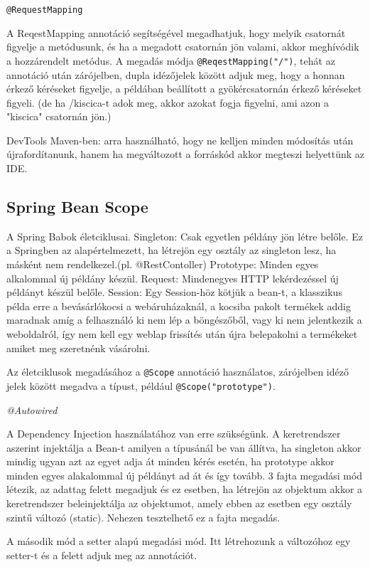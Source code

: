 \documentclass[11pt]{article}
\begin{document}
\texttt{@RequestMapping}

A ReqestMapping annotáció segítségével megadhatjuk, hogy melyik csatornát figyelje a metódusunk, és ha a megadott csatornán jön valami, akkor meghívódik a hozzárendelt metódus.  A megadás módja \texttt{@ReqestMapping("/")}, tehát az annotáció után zárójelben, dupla idézőjelek között adjuk meg, hogy a honnan érkező kéréseket figyelje, a példában beállított a gyökércsatornán érkező kéréseket figyeli. (de ha /kiscica-t adok meg, akkor azokat fogja figyelni, ami azon a "kiscica" csatornán jön.)

DevTools Maven-ben: arra használható, hogy ne kelljen minden módosítás után újrafordítanunk, hanem ha megváltozott a forráskód akkor megteszi helyettünk az IDE.

\subsection{Spring Bean Scope}

A Spring Babok életciklusai.
Singleton: Csak egyetlen példány jön létre belőle. Ez a Springben az alapértelmezett, ha létrejön egy osztály az singleton lesz, ha másként nem rendelkezel.(pl. @RestContoller)
Prototype: Minden egyes alkalommal új példány készül.
Request: Mindenegyes HTTP lekérdezéssel új példányt készül belőle.
Session: Egy Session-höz kötjük a bean-t, a klasszikus példa erre a bevásárlókocsi a webáruházaknál, a kocsiba pakolt termékek addig maradnak amíg a felhasználó ki nem lép a böngészőből, vagy ki nem jelentkezik a weboldalról, így nem kell egy weblap frissítés után újra belepakolni a termékeket amiket meg szeretnénk vásárolni.

Az életciklusok megadásához a \texttt{@Scope} annotáció használatos, zárójelben idéző jelek között megadva a típust, például \texttt{@Scope("prototype")}.

\textit{@Autowired}

A Dependency Injection használatához van erre szükségünk. A keretrendszer aszerint injektálja a Bean-t amilyen a típusánál be van állítva, ha singleton akkor mindig ugyan azt az egyet adja át minden kérés esetén, ha prototype akkor minden egyes alakalommal új példányt ad át és így tovább.
3 fajta megadási mód létezik, az adattag felett megadjuk és ez esetben, ha létrejön az objektum akkor a keretrendszer beleinjektálja az objektumot, amely ebben az esetben egy osztály szintű változó (static). Nehezen tesztelhető ez a fajta megadás.

A második mód a setter alapú megadási mód. Itt létrehozunk a változóhoz egy setter-t és a felett adjuk meg az annotációt.
\end{document}
